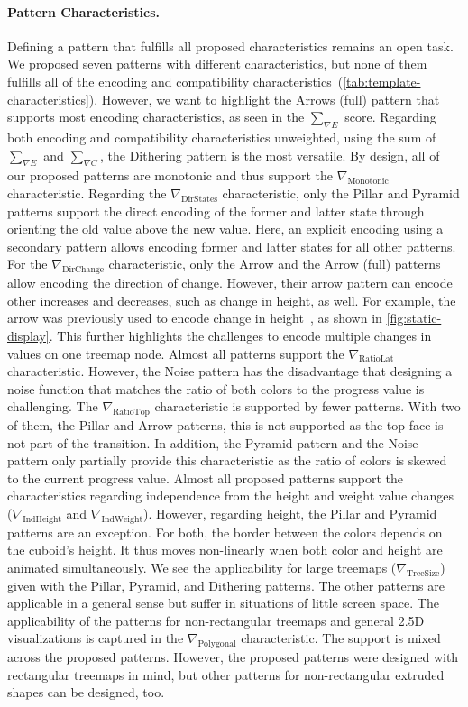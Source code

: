 \documentclass[smallextended,natbib]{svjour3}       %
\begin{document}
\paragraph{Pattern Characteristics.}
Defining a pattern that fulfills all proposed characteristics remains an open task. We proposed seven patterns with different characteristics, but none of them fulfills all of the encoding and compatibility characteristics~(\autoref{tab:template-characteristics}).
However, we want to highlight the Arrows (full) pattern that supports most encoding characteristics,
as seen in the $\sum_{\nabla E}$ score.
Regarding both encoding and compatibility characteristics unweighted, using the sum of $\sum_{\nabla E}$ and $\sum_{\nabla C}$, the Dithering pattern is the most versatile.
By design, all of our proposed patterns are monotonic and thus support the $\nabla_{\textrm{Monotonic}}$ characteristic.
Regarding the $\nabla_{\textrm{DirStates}}$ characteristic, only the Pillar and Pyramid patterns support the direct encoding of the former and latter state through orienting the old value above the new value. Here, an explicit encoding using a secondary pattern allows encoding former and latter states for all other patterns.
For the $\nabla_{\textrm{DirChange}}$ characteristic, only the Arrow and the Arrow (full) patterns allow encoding the direction of change.
However, their arrow pattern can encode other increases and decreases, such as change in height, as well.
For example, the arrow was previously used to encode change in height~\citep{limberger2019-insitu}, as shown in \autoref{fig:static-display}.
This further highlights the challenges to encode multiple changes in values on one treemap node.
Almost all patterns support the $\nabla_{\textrm{RatioLat}}$ characteristic.
However, the Noise pattern has the disadvantage that designing a noise function that matches the ratio of both colors to the progress value is challenging.
The $\nabla_{\textrm{RatioTop}}$ characteristic is supported by fewer patterns. With two of them, the Pillar and Arrow patterns, this is not supported as the top face is not part of the transition. 
In addition, the Pyramid pattern and the Noise pattern only partially provide this characteristic as the ratio of colors is skewed to the current progress value.
Almost all proposed patterns support the characteristics regarding independence from the height and weight value changes ($\nabla_{\textrm{IndHeight}}$ and $\nabla_{\textrm{IndWeight}}$).
However, regarding height, the Pillar and Pyramid patterns are an exception. For both, the border between the colors depends on the cuboid's height. 
It thus moves non-linearly when both color and height are animated simultaneously.
We see the applicability for large treemaps ($\nabla_{\textrm{TreeSize}}$) given with the Pillar, Pyramid, and Dithering patterns. The other patterns are applicable in a general sense but suffer in situations of little screen space.
The applicability of the patterns for non-rectangular treemaps and general 2.5D visualizations is captured in the $\nabla_{\textrm{Polygonal}}$ characteristic. The support is mixed across the proposed patterns. However, the proposed patterns were designed with rectangular treemaps in mind, but other patterns for non-rectangular extruded shapes can be designed, too.
\end{document}
